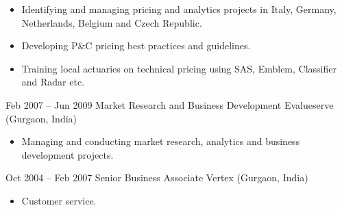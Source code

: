 \documentclass[a4paper,]{fortysecondscv}
\begin{document}
\begin{cvtable}
{				\begin{itemize}[nosep, leftmargin=0pt] %
					\item Identifying and managing pricing and analytics projects in Italy, Germany, Netherlands, Belgium and Czech Republic.
					\item Developing P\&C pricing best practices and guidelines.
					\item Training local actuaries on technical pricing using SAS, Emblem, Classifier and Radar etc.
				\end{itemize}
			}
        \vspace{\topsep}
		\cvitem
			{Feb 2007 -- Jun 2009}
			{Market Research and Business Development}
			{Evalueserve (Gurgaon, India)}
			{
				\begin{itemize}[nosep, leftmargin=0pt] %
					\item Managing and conducting market research, analytics and business development projects.
				\end{itemize}
			}
	\end{cvtable}





\newpage
\makebacksidebar

	\begin{cvtable}%

        \vspace{\topsep}
		\cvitem
			{Oct 2004 -- Feb 2007}
			{Senior Business Associate}
			{Vertex (Gurgaon, India)}
			{
				\vspace{-\topsep}
				\begin{itemize}[nosep, leftmargin=0pt] %
					\item Customer service.
				\end{itemize}
			}

    \end{cvtable}
\end{document}
